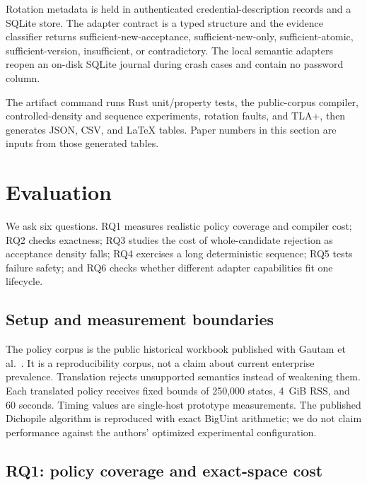 \documentclass[preprint,12pt]{elsarticle}
\begin{document}
Rotation metadata is held in authenticated credential-description records and a
SQLite store. The adapter contract is a typed structure and the evidence
classifier returns sufficient-new-acceptance, sufficient-new-only,
sufficient-atomic, sufficient-version, insufficient, or contradictory. The
local semantic adapters reopen an on-disk SQLite journal during crash cases and
contain no password column.

The artifact command runs Rust unit/property tests, the public-corpus compiler,
controlled-density and sequence experiments, rotation faults, and TLA+, then
generates JSON, CSV, and LaTeX tables. Paper numbers in this section are inputs
from those generated tables.

\section{Evaluation}

We ask six questions. RQ1 measures realistic policy coverage and compiler cost;
RQ2 checks exactness; RQ3 studies the cost of whole-candidate rejection as
acceptance density falls; RQ4 exercises a long deterministic sequence; RQ5
tests failure safety; and RQ6 checks whether different adapter capabilities fit
one lifecycle.

\subsection{Setup and measurement boundaries}

The policy corpus is the public historical workbook published with Gautam et
al.~\cite{gautam2022pcp}. It is a reproducibility corpus, not a claim about
current enterprise prevalence. Translation rejects unsupported semantics
instead of weakening them. Each translated policy receives fixed bounds of
250,000 states, 4~GiB RSS, and 60 seconds. Timing values are single-host
prototype measurements. The published Dichopile algorithm is reproduced with
exact BigUint arithmetic; we do not claim performance against the authors'
optimized experimental configuration.

\subsection{RQ1: policy coverage and exact-space cost}

\begin{table}[t]
\centering
\caption{Public policy corpus clean run.}
\label{tab:corpus}

\end{table}
\end{document}
